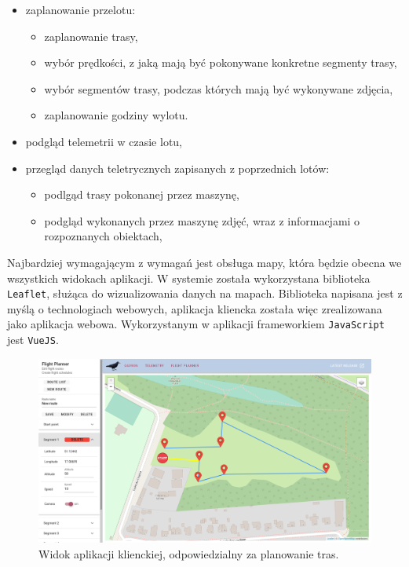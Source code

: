\begin{itemize}
	\item zaplanowanie przelotu:
	\begin{itemize}
		\item zaplanowanie trasy,
		\item wybór prędkości, z jaką mają być pokonywane konkretne segmenty trasy,
		\item wybór segmentów trasy, podczas których mają być wykonywane zdjęcia,
		\item zaplanowanie godziny wylotu.
	\end{itemize}
	\item podgląd telemetrii w czasie lotu,
	\item przegląd danych teletrycznych zapisanych z poprzednich lotów:
	\begin{itemize}
		\item podlgąd trasy pokonanej przez maszynę,
		\item podgląd wykonanych przez maszynę zdjęć,
				wraz z informacjami o rozpoznanych obiektach,
	\end{itemize} 
\end{itemize}

Najbardziej wymagającym z wymagań jest obsługa mapy, która będzie obecna we wszystkich
widokach aplikacji. W systemie została wykorzystana biblioteka \texttt{Leaflet}, 
służąca do wizualizowania danych na mapach. Biblioteka napisana jest z myślą o technologiach 
webowych, aplikacja kliencka została więc zrealizowana jako aplikacja webowa.
Wykorzystanym w aplikacji frameworkiem \texttt{JavaScript} jest \texttt{VueJS}. 

\begin{figure}[H]
	\centering
\includegraphics[width=\linewidth]{rys03/flight_planner.png}
	\caption{ Widok aplikacji klienckiej, odpowiedzialny za planowanie tras. }
	\label{frontend_flight_planner}
\end{figure}


